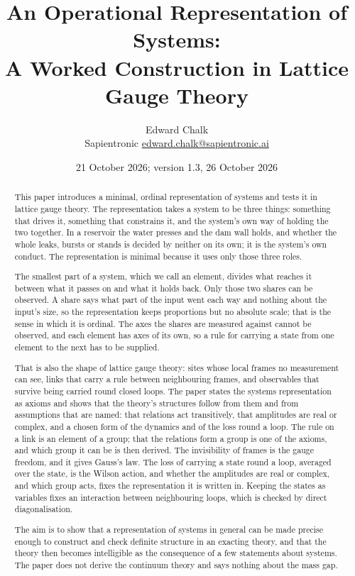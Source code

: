\documentclass[11pt,a4paper]{article}
\title{An Operational Representation of Systems:\\ A Worked Construction in Lattice Gauge Theory}
\author{Edward Chalk\\ \small Sapientronic \quad \href{mailto:edward.chalk@sapientronic.ai}{edward.chalk@sapientronic.ai}}
\date{21 October 2026; version 1.3, 26 October 2026}
\theoremstyle{plain}
\theoremstyle{definition}
\theoremstyle{remark}
\begin{document}
\maketitle

\begin{abstract}
This paper introduces a minimal, ordinal representation of systems and tests it in lattice gauge theory. The representation takes a system to be three things: something that drives it, something that constrains it, and the system's own way of holding the two together. In a reservoir the water presses and the dam wall holds, and whether the whole leaks, bursts or stands is decided by neither on its own; it is the system's own conduct. The representation is minimal because it uses only those three roles.

The smallest part of a system, which we call an element, divides what reaches it between what it passes on and what it holds back. Only those two shares can be observed. A share says what part of the input went each way and nothing about the input's size, so the representation keeps proportions but no absolute scale; that is the sense in which it is ordinal. The axes the shares are measured against cannot be observed, and each element has axes of its own, so a rule for carrying a state from one element to the next has to be supplied.

That is also the shape of lattice gauge theory: sites whose local frames no measurement can see, links that carry a rule between neighbouring frames, and observables that survive being carried round closed loops. The paper states the systems representation as axioms and shows that the theory's structures follow from them and from assumptions that are named: that relations act transitively, that amplitudes are real or complex, and a chosen form of the dynamics and of the loss round a loop. The rule on a link is an element of a group; that the relations form a group is one of the axioms, and which group it can be is then derived. The invisibility of frames is the gauge freedom, and it gives Gauss's law. The loss of carrying a state round a loop, averaged over the state, is the Wilson action, and whether the amplitudes are real or complex, and which group acts, fixes the representation it is written in. Keeping the states as variables fixes an interaction between neighbouring loops, which is checked by direct diagonalisation.

The aim is to show that a representation of systems in general can be made precise enough to construct and check definite structure in an exacting theory, and that the theory then becomes intelligible as the consequence of a few statements about systems. The paper does not derive the continuum theory and says nothing about the mass gap.
\end{abstract}
\end{document}
